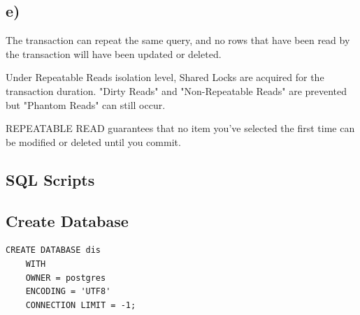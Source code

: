 \documentclass[ngerman]{dis-template-add}
\begin{document}
\subsection*{e)}




The transaction can repeat the same query, and no rows that have been read by the transaction will have been updated or deleted.



Under Repeatable Reads isolation level, Shared Locks are acquired for the transaction duration. "Dirty Reads" and "Non-Repeatable Reads" are prevented but "Phantom Reads" can still occur.

REPEATABLE READ guarantees that no item you've selected the first time can be modified or deleted until you commit.









\subsection*{SQL Scripts}

\subsection*{Create Database}

\begin{verbatim}
CREATE DATABASE dis
    WITH 
    OWNER = postgres
    ENCODING = 'UTF8'
    CONNECTION LIMIT = -1;
\end{verbatim}
\end{document}
